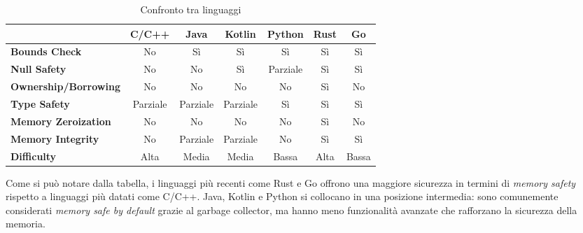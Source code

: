 \small
\setlength{\tabcolsep}{4pt}
\begin{table}[H]
  \centering
  \begin{tabular}{l|c|c|c|c|c|c|}
    \multicolumn{1}{l}{}         & \textbf{C/C++}                & \textbf{Java}                 & \textbf{Kotlin}               & \textbf{Python}               & \textbf{Rust}          & \textbf{Go}               \\
    \hline
    \textbf{Bounds Check}        & \cellcolor{red!20}No          & \cellcolor{green!20}Sì        & \cellcolor{green!20}Sì        & \cellcolor{green!20}Sì        & \cellcolor{green!20}Sì & \cellcolor{green!20}Sì    \\
    \textbf{Null Safety}         & \cellcolor{red!20}No          & \cellcolor{red!20}No          & \cellcolor{green!20}Sì        & \cellcolor{yellow!20}Parziale & \cellcolor{green!20}Sì & \cellcolor{green!20}Sì    \\
    \textbf{Ownership/Borrowing} & \cellcolor{red!20}No          & \cellcolor{red!20}No          & \cellcolor{red!20}No          & \cellcolor{red!20}No          & \cellcolor{green!20}Sì & \cellcolor{red!20}No      \\
    \textbf{Type Safety}         & \cellcolor{yellow!20}Parziale & \cellcolor{yellow!20}Parziale & \cellcolor{yellow!20}Parziale & \cellcolor{green!20}Sì        & \cellcolor{green!20}Sì & \cellcolor{green!20}Sì    \\
    \textbf{Memory Zeroization}  & \cellcolor{red!20}No          & \cellcolor{red!20}No          & \cellcolor{red!20}No          & \cellcolor{red!20}No          & \cellcolor{green!20}Sì & \cellcolor{red!20}No      \\
    \textbf{Memory Integrity}    & \cellcolor{red!20}No          & \cellcolor{yellow!20}Parziale & \cellcolor{yellow!20}Parziale & \cellcolor{red!20}No          & \cellcolor{green!20}Sì & \cellcolor{green!20}Sì    \\
    \textbf{Difficulty}          & \cellcolor{red!20}Alta        & \cellcolor{yellow!20}Media    & \cellcolor{yellow!20}Media    & \cellcolor{green!20}Bassa     & \cellcolor{red!20}Alta & \cellcolor{green!20}Bassa \\
    \hline
  \end{tabular}
  \caption{Confronto tra linguaggi}
  \label{tab:linguaggi_memory_safety}
\end{table}

Come si può notare dalla tabella, i linguaggi più recenti come Rust e Go offrono
una maggiore sicurezza in termini di \textit{memory safety} rispetto a linguaggi
più datati come C/C++. Java, Kotlin e Python si collocano in una posizione intermedia:
sono comunemente considerati \textit{memory safe by default} grazie al garbage collector,
ma hanno meno funzionalità avanzate che rafforzano la sicurezza della memoria.

